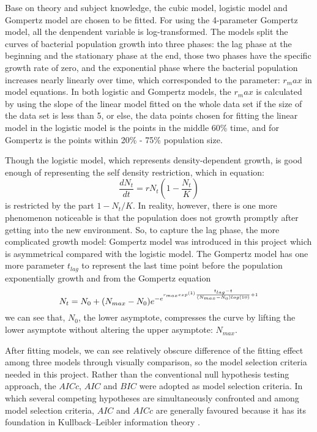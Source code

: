 \documentclass[11pt, a4paper]{article}
\begin{document}
Base on theory and subject knowledge, the cubic model, logistic model and Gompertz model\citep{zwietering1990modeling} are chosen to be fitted. For using the 4-parameter Gompertz model, all the denpendent variable is log-transformed\citep{tjorve2017use}. The models split the curves of bacterial population growth into three phases: the lag phase at the beginning and the stationary phase at the end, those two phases have the specific growth rate of zero, and the exponential phase where the bacterial population increases nearly linearly over time, which corresponded to the parameter: $r_max$ in model  equations. In both logistic and Gompertz models, the $r_max$ is calculated by using the slope of the linear model fitted on the whole data set if the size of the data set is less than 5, or else, the data points chosen for fitting the linear model in the logistic model is the points in the middle 60\% time, and for Gompertz is the points within 20\% - 75\% population size. 

Though the logistic model, which represents density-dependent growth\citep{eberhardt2008analyzing}, is good enough of representing the self density restriction, which in equation: \begin{equation} \label{eqn:Logistci}
    \frac{dN_t}{dt}= rN_t(1-\frac{N_t}{K})
\end{equation} is restricted by the part $1-N_t/K$. In reality, however, there is one more phenomenon noticeable is that the population does not growth promptly after getting into the new environment. So, to capture the lag phase, the more complicated growth model: Gompertz model was introduced in this project which is asymmetrical compared with the logistic model. The Gompertz model has one more parameter $t_{lag}$ to represent the last time point before the population exponentially growth and from the Gompertz equation \begin{equation} \label{eqn:GompEqn}
    N_t= N_0 + (N_{max} - N_0) e^{-e^{r_{max} exp^{(1)}  {\frac{t_{lag}-t}{(N_{max}-N_0)log(10)}\\} +1}}
\end{equation} we can see that, $N_0$, the lower asymptote, compresses the curve by lifting the lower asymptote without altering the upper asymptote: $N_{max}$.\citep{tjorve2017use}

After fitting models, we can see relatively obscure difference of the fitting effect among three models through visually comparison, so the model selection criteria needed in this project. Rather than the conventional null hypothesis testing approach, the $AICc$, $AIC$ and $BIC$\citep{johnson2004model} were adopted as model selection criteria. In which several competing hypotheses are simultaneously confronted and among model selection criteria, $AIC$ and $AICc$ are generally favoured because it has its foundation in Kullback–Leibler information theory \citep{anderson2004model}. 
\end{document}
